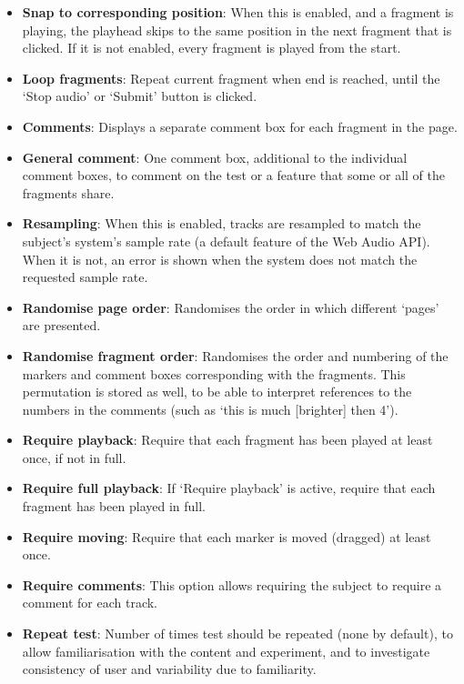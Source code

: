 \documentclass{article}
\begin{document}
\begin{itemize}
\item \textbf{Snap to corresponding position}: When this is enabled, and a fragment is playing, the playhead skips to the same position in the next fragment that is clicked. If it is not enabled, every fragment is played from the start. 
\item \textbf{Loop fragments}: Repeat current fragment when end is reached, until the `Stop audio' or `Submit' button is clicked. 
\item \textbf{Comments}: Displays a separate comment box for each fragment in the page.
\item \textbf{General comment}: One comment box, additional to the individual comment boxes, to comment on the test or a feature that some or all of the fragments share. 
\item \textbf{Resampling}: When this is enabled, tracks are resampled to match the subject's system's sample rate (a default feature of the Web Audio API). When it is not, an error is shown when the system does not match the requested sample rate. 
\item \textbf{Randomise page order}: Randomises the order in which different `pages' are presented. %
\item \textbf{Randomise fragment order}: Randomises the order and numbering of the markers and comment boxes corresponding with the fragments. This permutation is stored as well, to be able to interpret references to the numbers in the comments (such as `this is much [brighter] then 4'). 
\item \textbf{Require playback}: Require that each fragment has been played at least once, if not in full. 
\item \textbf{Require full playback}: If `Require playback' is active, require that each fragment has been played in full. 
\item \textbf{Require moving}: Require that each marker is moved (dragged) at least once. 
\item \textbf{Require comments}: This option allows requiring the subject to require a comment for each track. 
\item \textbf{Repeat test}: Number of times test should be repeated (none by default), to allow familiarisation with the content and experiment, and to investigate consistency of user and variability due to familiarity.
\end{itemize}
\end{document}
